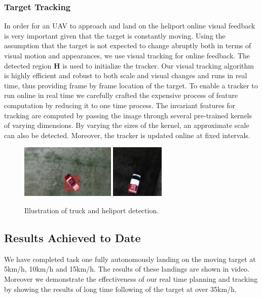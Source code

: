 \documentclass{standalone}
\begin{document}
\subsubsection{Target Tracking}

In order for an UAV to approach and land on the heliport online visual
feedback is very important given that the target is constantly moving.
Using the assumption that the target is not
expected to change abruptly both in terms of visual motion and
appearances, we use visual tracking for online feedback.
The detected region $\mathbf{H}$ is used to initialize the
tracker. Our visual tracking algorithm is highly efficient and robust
to both scale and visual changes and runs in real time, thus
providing frame by frame location of the target. To enable a tracker
to run online in real time we carefully crafted the expensive process
of feature computation by reducing it to one time process. 
The invariant features for tracking are computed by passing the image
through several pre-trained kernels of varying dimensions. By varying
the sizes of the kernel, an approximate scale can also be detected.
Moreover, the tracker is updated online at fixed intervals.

\begin{figure}[t!]
  \centering
  \includegraphics[height=1in]{sections/task1/images/detect2}
  \includegraphics[height=1in]{sections/task1/images/detect1}
  \caption{Illustration of truck and heliport detection.}
\end{figure}

\subsection{Results Achieved to Date}

We have completed task one fully autonomously landing on the moving
target at 5km/h, 10km/h and 15km/h. The results of these landings are
shown in video. Moreover we demonstrate the effectiveness of our real
time planning and tracking by showing the results of long time
following of the target at over 35km/h. 
\end{document}
